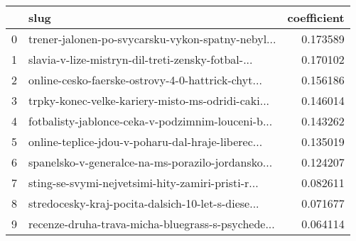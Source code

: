 \begin{tabular}{llr}
\toprule
{} &                                               slug &  coefficient \\
\midrule
0 &  trener-jalonen-po-svycarsku-vykon-spatny-nebyl... &     0.173589 \\
1 &  slavia-v-lize-mistryn-dil-treti-zensky-fotbal-... &     0.170102 \\
2 &  online-cesko-faerske-ostrovy-4-0-hattrick-chyt... &     0.156186 \\
3 &  trpky-konec-velke-kariery-misto-ms-odridi-caki... &     0.146014 \\
4 &  fotbalisty-jablonce-ceka-v-podzimnim-louceni-b... &     0.143262 \\
5 &  online-teplice-jdou-v-poharu-dal-hraje-liberec... &     0.135019 \\
6 &  spanelsko-v-generalce-na-ms-porazilo-jordansko... &     0.124207 \\
7 &  sting-se-svymi-nejvetsimi-hity-zamiri-pristi-r... &     0.082611 \\
8 &  stredocesky-kraj-pocita-dalsich-10-let-s-diese... &     0.071677 \\
9 &  recenze-druha-trava-micha-bluegrass-s-psychede... &     0.064114 \\
\bottomrule
\end{tabular}
